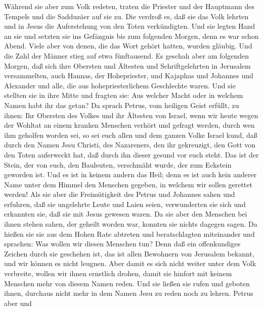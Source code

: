  Während sie aber zum Volk redeten, traten die Priester
und der Hauptmann des Tempels und die Sadduzäer auf sie zu.
 Die verdroß es, daß sie das Volk lehrten und in Jesus die
Auferstehung von den Toten verkündigten.  Und sie legten
Hand an sie und setzten sie ins Gefängnis bis zum folgenden Morgen, denn
es war schon Abend.  Viele aber von denen, die das Wort
gehört hatten, wurden gläubig. Und die Zahl der Männer stieg auf etwa
fünftausend.  Es geschah aber am folgenden Morgen, daß
sich ihre Obersten und Ältesten und Schriftgelehrten in Jerusalem
versammelten,  auch Hannas, der Hohepriester, und Kajaphas
und Johannes und Alexander und alle, die aus hohepriesterlichem
Geschlechte waren.  Und sie stellten sie in ihre Mitte und
fragten sie: Aus welcher Macht oder in welchem Namen habt ihr das getan?
 Da sprach Petrus, vom heiligen Geist erfüllt, zu ihnen:
Ihr Obersten des Volkes und ihr Ältesten von Israel,  wenn
wir heute wegen der Wohltat an einem kranken Menschen verhört und
gefragt werden, durch wen ihm geholfen worden sei,  so
sei euch allen und dem ganzen Volke Israel kund, daß durch den Namen
Jesu Christi, des Nazareners, den ihr gekreuzigt, den Gott von den Toten
auferweckt hat, daß durch ihn dieser gesund vor euch steht.
 Das ist der Stein, der von euch, den Bauleuten,
verschmäht wurde, der zum Eckstein geworden ist.  Und es
ist in keinem andern das Heil; denn es ist auch kein anderer Name unter
dem Himmel den Menschen gegeben, in welchem wir sollen gerettet werden!
 Als sie aber die Freimütigkeit des Petrus und Johannes
sahen und erfuhren, daß sie ungelehrte Leute und Laien seien,
verwunderten sie sich und erkannten sie, daß sie mit Jesus gewesen
waren.  Da sie aber den Menschen bei ihnen stehen sahen,
der geheilt worden war, konnten sie nichts dagegen sagen.
 Da hießen sie sie aus dem Hohen Rate abtreten und
beratschlagten miteinander und sprachen:  Was wollen wir
diesen Menschen tun? Denn daß ein offenkundiges Zeichen durch sie
geschehen ist, das ist allen Bewohnern von Jerusalem bekannt, und wir
können es nicht leugnen.  Aber damit es sich nicht weiter
unter dem Volk verbreite, wollen wir ihnen ernstlich drohen, damit sie
hinfort mit keinem Menschen mehr von diesem Namen reden. 
Und sie ließen sie rufen und geboten ihnen, durchaus nicht mehr in dem
Namen Jesu zu reden noch zu lehren.  Petrus aber und

